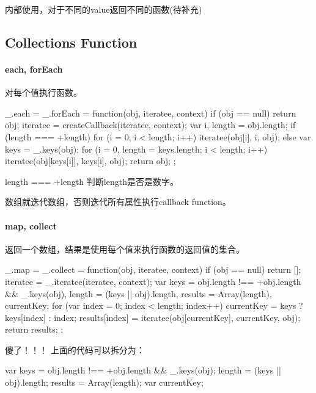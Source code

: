 内部使用，对于不同的value返回不同的函数(待补充)

\subsection{Collections Function}
\paragraph{each, forEach}对每个值执行函数。
\begin{JavaScript}
  _.each = _.forEach = function(obj, iteratee, context) {
    if (obj == null) return obj;
    iteratee = createCallback(iteratee, context);
    var i, length = obj.length;
    if (length === +length) {
      for (i = 0; i < length; i++) {
        iteratee(obj[i], i, obj);
      }
    } else {
      var keys = _.keys(obj);
      for (i = 0, length = keys.length; i < length; i++) {
        iteratee(obj[keys[i]], keys[i], obj);
      }
    }
    return obj;
  };
\end{JavaScript}
	
length === +length 判断length是否是数字。

数组就迭代数组，否则迭代所有属性执行callback function。

\paragraph{map, collect}返回一个数组，结果是使用每个值来执行函数的返回值的集合。
\begin{JavaScript}
  _.map = _.collect = function(obj, iteratee, context) {
    if (obj == null) return [];
    iteratee = _.iteratee(iteratee, context);
    var keys = obj.length !== +obj.length && _.keys(obj),
        length = (keys || obj).length,
        results = Array(length),
        currentKey;
    for (var index = 0; index < length; index++) {
      currentKey = keys ? keys[index] : index;
      results[index] = iteratee(obj[currentKey], currentKey, obj);
    }
    return results;
  };
\end{JavaScript}	

傻了！！！ 上面的代码可以拆分为：

\begin{JavaScript}
  var keys = obj.length !== +obj.length && _.keys(obj); 
  length = (keys || obj).length;
  results = Array(length);
  var currentKey;
\end{JavaScript}





